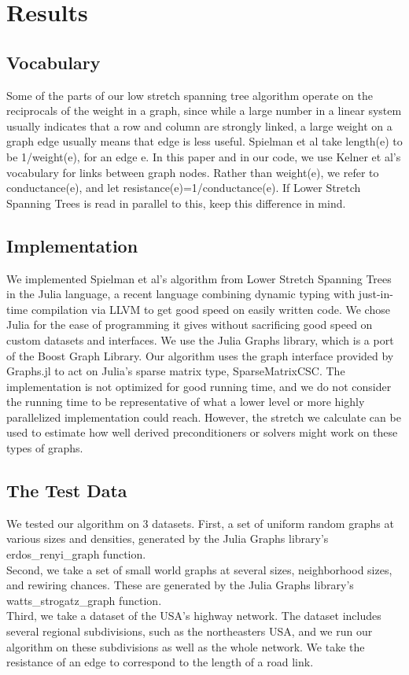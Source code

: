 \documentclass{article}
\begin{document}
\section*{Results}
\subsection*{Vocabulary}
Some of the parts of our low stretch spanning tree algorithm operate on the reciprocals of the weight in a graph, since while a large number in a linear system usually indicates that a row and column are strongly linked, a large weight on a graph edge usually means that edge is less useful.  Spielman et al take length(e) to be 1/weight(e), for an edge e.  In this paper and in our code, we use Kelner et al's vocabulary for links between graph nodes.  Rather than weight(e), we refer to conductance(e), and let resistance(e)=1/conductance(e).  If Lower Stretch Spanning Trees is read in parallel to this, keep this difference in mind.  
\subsection{Implementation}
We implemented Spielman et al's algorithm from Lower Stretch Spanning Trees in the Julia language, a recent language combining dynamic typing with just-in-time compilation via LLVM to get good speed on easily written code.  We chose Julia for the ease of programming it gives without sacrificing good speed on custom datasets and interfaces.  We use the Julia Graphs library\cite{juliagraphs}, which is a port of the Boost Graph Library.  Our algorithm uses the graph interface provided by Graphs.jl to act on Julia's sparse matrix type, SparseMatrixCSC.  The implementation is not optimized for good running time, and we do not consider the running time to be representative of what a lower level or more highly parallelized implementation could reach.  However, the stretch we calculate can be used to estimate how well derived preconditioners or solvers might work on these types of graphs.\\
\subsection*{The Test Data}
We tested our algorithm on 3 datasets.  First, a set of uniform random graphs at various sizes and densities, generated by the Julia Graphs library's erdos\_renyi\_graph function.\\
Second, we take a set of small world graphs at several sizes, neighborhood sizes, and rewiring chances.  These are generated by the Julia Graphs library's watts\_strogatz\_graph function.\\
Third, we take a dataset of the USA's highway network.  The dataset includes several regional subdivisions, such as the northeasters USA, and we run our algorithm on these subdivisions as well as the whole network.  We take the resistance of an edge to correspond to the length of a road link. \\
\end{document}
